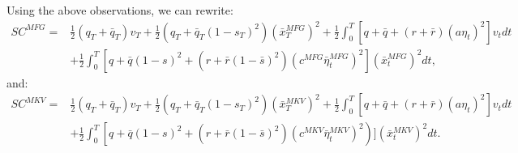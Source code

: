 \documentclass[11pt]{article}
\begin{document}
Using the above observations, we can rewrite:
\begin{equation}
\begin{split}
    SC^{MFG}=&\frac{1}{2}(q_T+\bar{q}_T)v_T+\frac{1}{2}\left(q_T+\bar{q}_T(1-s_T)^2\right)(\bar{x}_T^{MFG})^2+\frac{1}{2}\int_0^T \left[q+\bar{q}+(r+\bar{r})(a\eta_t)^2\right]v_tdt\\
    &+\frac{1}{2}\int_0^T\left[q+\bar{q}(1-s)^2+(r+\bar{r}(1-\bar{s})^2)(c^{MFG}\bar{\eta}_t^{MFG})^2\right](\bar{x}_t^{MFG})^2dt,
\end{split}
\label{eq:SC_MFG_1}
\end{equation}
and:
\begin{equation}
\begin{split}
    SC^{MKV}=&\frac{1}{2}(q_T+\bar{q}_T)v_T+\frac{1}{2}\left(q_T+\bar{q}_T(1-s_T)^2\right)(\bar{x}_T^{MKV})^2+ \frac{1}{2}\int_0^T \left[q+\bar{q}+(r+\bar{r})(a\eta_t)^2\right]v_tdt \\
    &+\frac{1}{2}\int_0^T\left[q+\bar{q}(1-s)^2+(r+\bar{r}(1-\bar{s})^2)(c^{MKV}\bar{\eta}_t^{MKV})^2\right)](\bar{x}_t^{MKV})^2dt.
\end{split}
\label{eq:SC_MKV_1}
\end{equation}
\end{document}
